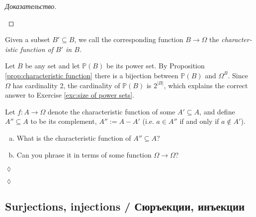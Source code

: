 \documentclass[a4paper]{book}
\def\PP{{\mathbb P}}
\def\to{\rightarrow}
\def\taking{\colon}
\def\ss{\subseteq}
\theoremstyle{myth}
\newtheorem{excENG}[envENG]{\begin{english}Exercise\end{english}}
\newtheorem{definitionENG}[envENG]{\begin{english}Definition\end{english}}
\newenvironment{exerciseENG}{\begin{excENG}}{\hspace*{\fill}$\lozenge$\end{excENG}}
\newtheorem{excRUS}[envRUS]{\begin{russian}Упражнение\end{russian}}
\newtheorem{definitionRUS}[envRUS]{\begin{russian}Определение\end{russian}}
\newenvironment{proofRUS}{\begin{proof}[Доказательство]}{\end{proof}}
\newenvironment{exerciseRUS}{\begin{excRUS}}{\hspace*{\fill}$\lozenge$\end{excRUS}}
\def\sexc{\begin{enumerate}[a.)]\setlength{\itemsep}{.1cm}\setlength{\parskip}{.1cm}\item}
\def\next{\item}
\def\endsexc{\end{enumerate}}
\begin{document}
\begin{english}
\begin{proofRUS}
\begin{russian} \end{russian}
\end{proofRUS}

\begin{definitionENG}

Given a subset $B'\ss B$, we call the corresponding function $B\to\Omega$ the {\em characteristic function of $B'$ in $B$.}
\end{definitionENG}

\begin{definitionRUS}
\begin{russian} \end{russian}
\end{definitionRUS}

Let $B$ be any set and let $\PP(B)$ be its power set. By Proposition \ref{prop:characteristic function} there is a bijection between $\PP(B)$ and $\Omega^B$. Since $\Omega$ has cardinality 2, the cardinality of $\PP(B)$ is $2^{|B|}$, which explains the correct answer to Exercise \ref{exc:size of power sets}.

\begin{russian} \end{russian}

\begin{exerciseENG}
Let $f\taking A\to\Omega$ denote the characteristic function of some $A'\ss A$, and define $A''\ss A$ to be its complement, $A'':=A-A'$ (i.e. $a\in A''$ if and only if $a\not\in A'$). 
\sexc What is the characteristic function of $A''\ss A$? 
\next Can you phrase it in terms of some function $\Omega\to\Omega$?
\endsexc
\end{exerciseENG}

\begin{exerciseRUS}
\begin{russian} \end{russian}
\end{exerciseRUS}


\subsection{Surjections, injections / Сюръекции, инъекции}


\end{english}
\end{document}

